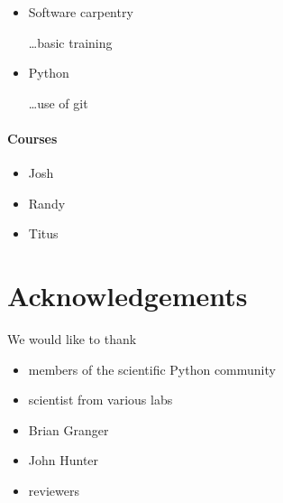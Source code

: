 \documentclass[ChapterTOCs,krantz2]{krantz} %
\begin{document}
\begin{itemize}

\item Software carpentry

\ldots basic training

\item Python

\ldots use of git

\end{itemize}

\paragraph{ {\bf Courses}}

\begin{itemize}

\item Josh

\item Randy

\item Titus

\end{itemize}


\section*{Acknowledgements}
We would like to thank
\begin{itemize}
\item members of the scientific Python community
\item scientist from various labs
\item Brian Granger
\item John Hunter
\item reviewers
\end{itemize}



\end{document}
